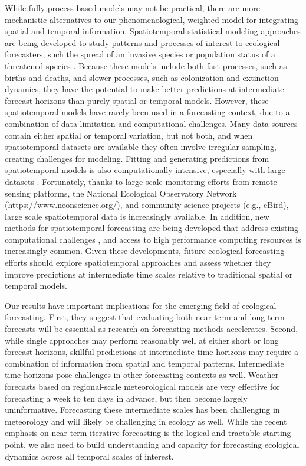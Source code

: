 \documentclass[11pt]{article}
\begin{document}
While fully process-based models may not be practical, there are more mechanistic alternatives to our phenomenological, weighted model for integrating spatial and temporal information. Spatiotemporal statistical modeling approaches are being developed to study patterns and processes of interest to ecological forecasters, such the spread of an invasive species or population status of a threatened species  \citep{Wikle2003,Williams2017,Schliep2018}. Because these models include both fast processes, such as births and deaths, and slower processes, such as colonization and extinction dynamics, they have the potential to make better predictions at intermediate forecast horizons than purely spatial or temporal models. However, these spatiotemporal models have rarely been used in a forecasting context, due to a combination of data limitation and computational challenges. Many data sources contain either spatial or temporal variation, but not both, and when spatiotemporal datasets are available they often involve irregular sampling, creating challenges for modeling. Fitting and generating predictions from spatiotemporal models is also computationally intensive, especially with large datasets \citep{McDermott2017}. Fortunately, thanks to large-scale monitoring efforts from remote sensing platforms, the National Ecological Observatory Network (https://www.neonscience.org/), and community science projects (e.g., eBird), large scale spatiotemporal data is increasingly available. In addition, new methods for spatiotemporal forecasting are being developed that address existing computational challenges \citep{McDermott2017}, and access to high performance computing resources is increasingly common. Given these developments, future ecological forecasting efforts should explore spatiotemporal approaches and assess whether they improve predictions at intermediate time scales relative to traditional spatial or temporal models.

Our results have important implications for the emerging field of ecological forecasting. First, they suggest that evaluating both near-term and long-term forecasts will be essential as research on forecasting methods accelerates. Second, while single approaches may perform reasonably well at either short or long forecast horizons, skillful predictions at intermediate time horizons may require a combination of information from spatial and temporal patterns. Intermediate time horizons pose challenges in other forecasting contexts as well. Weather forecasts based on regional-scale meteorological models are very effective for forecasting a week to ten days in advance, but then become largely uninformative. Forecasting these intermediate scales has been challenging in meteorology and will likely be challenging in ecology as well. While the recent emphasis on near-term iterative forecasting \citep{dietze_iterative_2018} is the logical and tractable starting point, we also need to build understanding and capacity for forecasting ecological dynamics across all temporal scales of interest.
\end{document}
